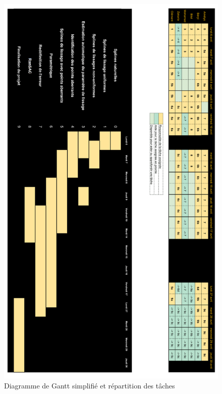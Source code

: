 \documentclass[a4paper,12pt]{article} %
\begin{document}
\begin{figure}
\begin{center}
\includegraphics[width=14cm]{p3.png} 
\end{center}
\caption{Diagramme de Gantt simplifié et répartition des tâches}
\label{DiagS}
\end{figure}
\end{document}
